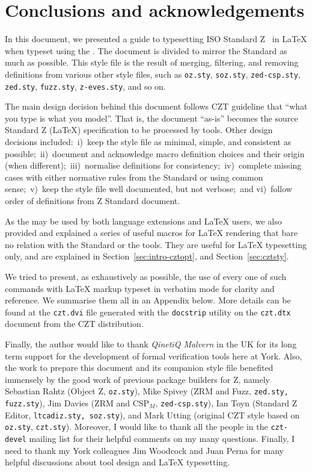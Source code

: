 \documentclass{article}
\newcommand{\emfile}[1]{\texttt{#1}}%
\begin{document}
\section{Conclusions and acknowledgements}\label{sec:conclusions}

In this document, we presented a guide to typesetting ISO Standard Z~\cite{isoz} in \LaTeX{}
when typeset using the \cztstylefile. The document is divided to mirror the
Standard as much as possible. This style file is the result of merging, filtering,
and removing definitions from various other style files, such as \texttt{oz.sty},
\texttt{soz.sty}, \texttt{zed-csp.sty}, \texttt{zed.sty}, \texttt{fuzz.sty},
\texttt{z-eves.sty}, and so on.

The main design decision behind this document follows CZT guideline that
``what you type is what you model''. That is, the document ``as-is'' becomes
the source Standard Z (\LaTeX) specification to be processed by tools. Other
design decisions included:~i)~keep the style file as minimal, simple, and
consistent as possible;~ii)~document and acknowledge macro definition choices
and their origin (when different);~iii)~normalise definitions for
consistency;~iv)~complete missing cases with either normative rules from
the Standard or using common sense;~v)~keep the style file well documented,
but not verbose;~and vi)~follow order of definitions from Z Standard document.

As the \cztstylefile may be used by both language extensions and \LaTeX{} users,
we also provided and explained a series of useful macros for \LaTeX{} rendering
that bare no relation with the Standard or the tools. They are useful for \LaTeX{}
typesetting only, and are explained in Section~\ref{sec:intro-cztopt}, and
Section~\ref{sec:cztsty}.

We tried to present, as exhaustively as possible, the use of every one
of such commands with \LaTeX{} markup typeset in verbatim mode for
clarity and reference. We summarise them all in an Appendix below.
More details can be found at the \texttt{czt.dvi} file generated with
the \texttt{docstrip} utility on the \texttt{czt.dtx} document from
the CZT distribution.

Finally, the author would like to thank \textit{QinetiQ Malvern} in the
UK for its long term support for the development of formal verification
tools here at York. Also, the work to prepare this document and its companion
style file benefited immensely by the good work of previous package
builders for Z, namely Sebastian Rahtz (Object Z, \emfile{oz.sty}),
Mike Spivey (ZRM and Fuzz, \emfile{zed.sty, fuzz.sty}), Jim Davies
(ZRM and CSP$_M$, \emfile{zed-csp.sty}), Ian Toyn (Standard Z Editor,
\emfile{ltcadiz.sty, soz.sty}), and Mark Utting (original CZT style
based on \emfile{oz.sty}, \emfile{czt.sty}). Moreover, I would like
to thank all the people in the \texttt{czt-devel} mailing list for
their helpful comments on my many questions. Finally, I need to
thank my York colleagues Jim Woodcock and Juan Perna for many helpful
discussions about tool design and \LaTeX{} typesetting.
\end{document}

